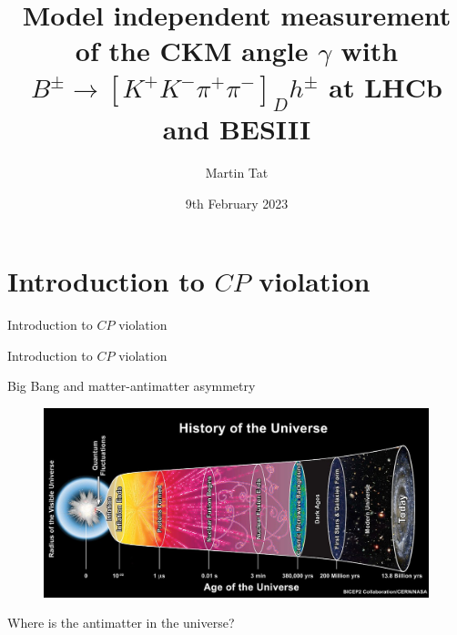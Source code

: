 \documentclass{beamer}
\title[$B^\pm\to{[K^+K^-\pi^+\pi^-]}_Dh^\pm$]{Model independent measurement of the CKM angle \texorpdfstring{$\gamma$}{gamma} with \texorpdfstring{$B^\pm\to[K^+K^-\pi^+\pi^-]_Dh^\pm$}{B2DhD2KKpipi} at LHCb and BESIII}
\author{Martin Tat}
\institute[University of Oxford]{\normalsize University of Oxford\\ \vspace{0.3cm}\normalsize Warwick EPP Seminar}
\date{9th February 2023}
\begin{document}
\begin{frame}
  \titlepage
\end{frame}


\section{Introduction to \texorpdfstring{$C\!P$}{CP} violation}
\begin{frame}{Introduction to $C\!P$ violation}
  \begin{center}
    {\huge Introduction to $C\!P$ violation}
  \end{center}
\end{frame}

\begin{frame}{Big Bang and matter-antimatter asymmetry}
  \begin{figure}
    \includegraphics[height=5.5cm]{Plots/BigBangHistory.jpg}
  \end{figure}
  \begin{center}
    \Large Where is the antimatter in the universe?
  \end{center}
\end{frame}
\end{document}
